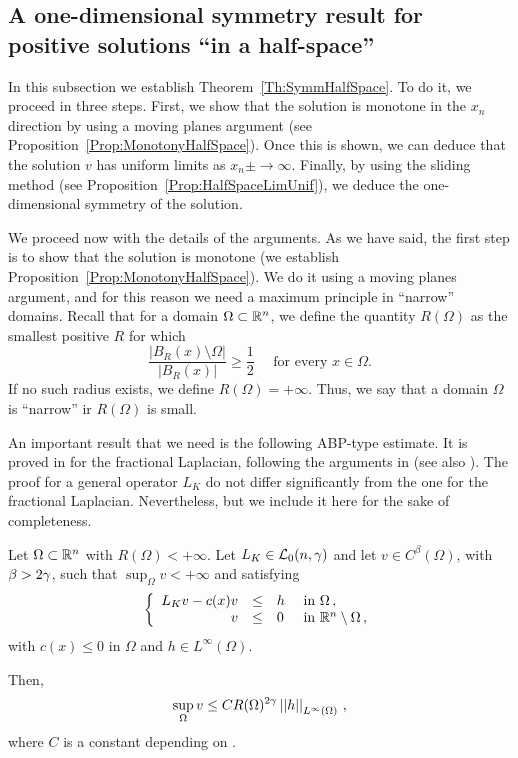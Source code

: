 \subsection{A one-dimensional symmetry result for positive solutions ``in a half-space''}

In this subsection we establish Theorem~\ref{Th:SymmHalfSpace}. To do it, we proceed in three steps. First, we show that the solution is monotone in the $x_n$ direction by using a moving planes argument (see Proposition~\ref{Prop:MonotonyHalfSpace}). Once this is shown, we can deduce that the solution $v$ has uniform limits as $x_n\pm\to \infty$. Finally, by using the sliding method (see Proposition~\ref{Prop:HalfSpaceLimUnif}), we deduce the one-dimensional symmetry of the solution.

We proceed now with the details of the arguments. As we have said, the first step is to show that the solution is monotone (we establish Proposition~\ref{Prop:MonotonyHalfSpace}). We do it using a moving planes argument, and for this reason we need a maximum principle in ``narrow'' domains. Recall that for a domain $\Omega \subset \mathbb{R}^n$, we define the quantity $R(\Omega)$ as the smallest positive $R$ for which
$$
\dfrac{|B_R(x)\setminus \Omega|}{|B_R(x)|}\geq \dfrac{1}{2} \quad \text{ for every } x \in \Omega.
$$
If no such radius exists, we define $R(\Omega) = +\infty$. Thus, we say that a domain $\Omega$ is ``narrow'' ir $R(\Omega)$ is small.


An important result that we need is the following ABP-type estimate. It is proved in \cite{QuaasXia} for the fractional Laplacian, following the arguments in \cite{Cabre-ABP} (see also \cite{Cabre-Topics}). The proof for a general operator $L_K$ do not differ significantly from the one for the fractional Laplacian. Nevertheless, but we include it here for the sake of completeness.

\begin{theorem}
	\label{Th:ABPEstimate}
	Let $\Omega \subset \mathbb{R}^n$ with $R(\Omega) < +\infty$. Let $L_K \in \mathcal{L}_0(n,\gamma)$ and let $v\in C^{\beta}(\Omega)$, with $\beta > 2\gamma$, such that $\sup_{\Omega} v < +\infty$ and satisfying
	$$
	\left\{\begin{array}{rcll}
	L_K v - c(x)v &\leq & h & \text{ in } \Omega\,, \\
	v & \leq & 0 & \text{ in } \mathbb{R}^n\setminus \Omega\,,
	\end{array} \right.
	$$
	with $c(x)\leq 0$ in $\Omega$ and $h\in L^\infty(\Omega)$.
	
	Then,
	$$
	\sup_\Omega v \leq C R(\Omega)^{2\gamma} \left | \left |{h} \right | \right |_{L^{\infty}(\Omega)}\,,
	$$
	where $C$ is a constant depending on .
\end{theorem}


